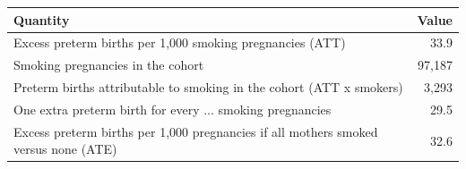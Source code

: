 {\small
\begin{tabular}{lr}
\toprule
Quantity & Value \\
\midrule
Excess preterm births per 1,000 smoking pregnancies (ATT) & 33.9 \\
Smoking pregnancies in the cohort & 97,187 \\
Preterm births attributable to smoking in the cohort (ATT x smokers) & 3,293 \\
One extra preterm birth for every ... smoking pregnancies & 29.5 \\
Excess preterm births per 1,000 pregnancies if all mothers smoked versus none (ATE) & 32.6 \\
\bottomrule
\end{tabular}
}
